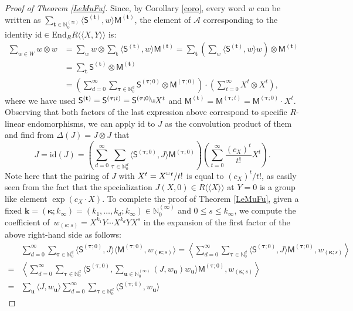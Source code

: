 \documentclass[10pt]{article}
\theoremstyle{definition}
\theoremstyle{remark}
\def\bk{{\mathbf{k}}}
\def\MM{{\mathsf{M}}}
\def\SS{{\mathsf{S}}}
\def\bt{{\mathbf{t}}}
\def\bu{{\mathbf{u}}}
\def\bkappa{{\boldsymbol \kappa}}
\def\btau{{\boldsymbol \tau}}
\def\lp{\langle}
\def\rp{\rangle}
\def\N{{\mathbb N}}
\def\la{\langle}
\def\ra{\rangle}
\def\lala{\la\!\la}
\def\rara{\ra\!\ra}
\def\bkappa{{\boldsymbol \kappa}}
\def\sha{\scalebox{0.6}[0.8]{\rotatebox[origin=c]{-90}{$\exists$}}}
\begin{document}
\begin{proof}[Proof of Theorem \ref{LeMuFu}]
Since, by Corollary \ref{coro}, every word $w$ can be written as 
$\sum_{\bt\in \N_0^{(\infty)}}
\lp \SS^{(\bt)},w \rp \MM^{(\bt)}$, 
the element of $\mathscr{A}$ corresponding to 
the identity $\mathrm{id}\in \mathrm{End}_RR\lala X,Y\rara$ is:
\begin{align*}
\sum_{w\in W} w\otimes w &=
\sum_w w\otimes \sum_\bt \lp \SS^{(\bt)},w \rp\MM^{(\bt)} 
=
\sum_\bt (\sum_w  \lp\SS^{(\bt)},w\rp w) \otimes \MM^{(\bt)} \\
&= 
\sum_\bt \SS^{(\bt)} \otimes \MM^{(\bt)} \\
&=
\left(\sum_{d=0}^\infty 
\sum_{\btau\in\N_0^d} \SS^{(\btau;0)}\otimes \MM^{(\btau;0)}\right)
\cdot
\left(\sum_{t=0}^\infty X^t\otimes X^t\right),
\end{align*}
where we have used
$\SS^{(\bt)}=\SS^{(\btau;t)}=\SS^{(\btau;0)}\sha X^t$ and 
$\MM^{(\bt)}=\MM^{(\btau;t)}=\MM^{(\btau;0)}\cdot X^t$.
Observing that both factors of the last expression above correspond to specific 
$R$-linear endomorphisms,
we can apply $\mathrm{id}$ to $J$ as the convolution product of them and find from
$\Delta(J)=J\otimes J$ that
\begin{equation} \label{J-expansion}
J=\mathrm{id}(J)=
\left(\sum_{d=0}^\infty 
\sum_{\btau\in\N_0^d} \lp \SS^{(\btau;0)},J \rp \MM^{(\btau;0)}\right)
\left(\sum_{t=0}^\infty \frac{(c_X)^t}{t !} X^t\right).
\end{equation}
Note here that the pairing of $J$ with 
$X^t=X^{\sha\, t}/t!$ is equal to $(c_X)^t/t !$,
as easily seen from the fact that the specialization 
$J(X,0)\in R\lala X\rara$ at $Y=0$ is a group like
element $\exp(c_X\cdot X)$.
To complete the proof of Theorem \ref{LeMuFu},
given a fixed $\bk=(\bkappa;k_\infty)=(k_1,\dots,k_d; k_\infty)\in\N_0^{(\infty)}$
and $0\le s\le k_\infty$, 
we compute
the coefficient of~$w_{(\kappa;s)}=X^{k_1}Y\cdots X^{k_d}YX^s$ in the expansion 
of the first factor of the above right-hand side as follows:
\begin{align*}
&\sum_{d=0}^\infty 
\sum_{\btau\in\N_0^d} 
\lp \SS^{(\btau;0)},J \rp 
\lp \MM^{(\btau;0)},w_{(\bkappa;s)} \rp 
=\left\lp\sum_{d=0}^\infty 
\sum_{\btau\in\N_0^d} \lp\SS^{(\btau;0)},J \rp \MM^{(\btau;0)},
w_{(\bkappa;s)} \right\rp \\
=&\left\lp\sum_{d=0}^\infty 
\sum_{\btau\in\N_0^d} 
\biggl\lp\SS^{(\btau;0)},\sum_{\bu\in \N_0^{(\infty)}}(J,w_\bu)w_\bu\biggr\rp
 \MM^{(\btau;0)},
w_{(\bkappa;s)}\right\rp \\
=&\sum_{\bu} \lp J,w_\bu \rp \sum_{d=0}^\infty 
\sum_{\btau\in\N_0^d} \lp \SS^{(\btau;0)},w_\bu \rp

\end{align*}
\end{proof}
\end{document}
